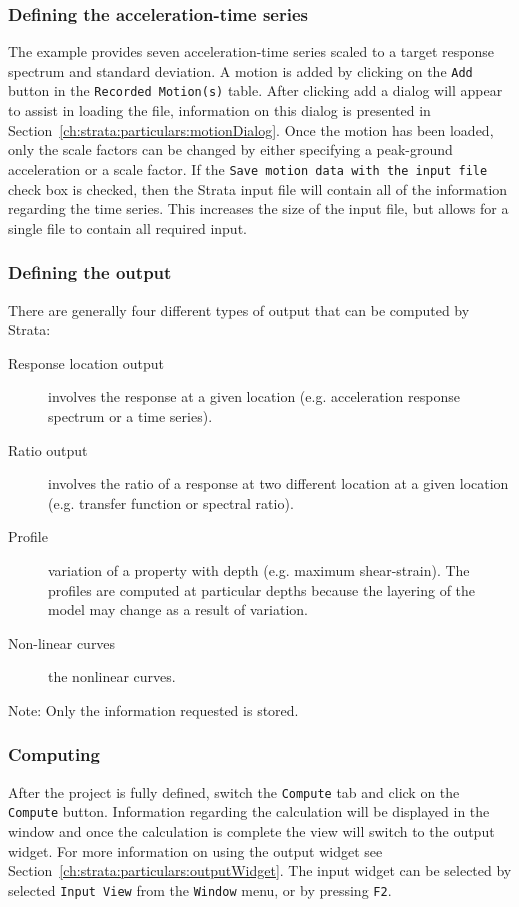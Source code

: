 \documentclass[12pt,oneside]{book}
\begin{document}
\subsubsection{Defining the acceleration-time series}
The example provides seven acceleration-time series scaled to a target response spectrum and
standard deviation.  A motion is added by clicking on the \texttt{Add} button in the
\texttt{Recorded Motion(s)} table.  After clicking add a dialog will appear to assist in loading the
file, information on this dialog is presented in Section~\ref{ch:strata:particulars:motionDialog}.
Once the motion has been loaded, only the scale factors can be changed by either specifying a
peak-ground acceleration or a scale factor.  If the \texttt{Save motion data with the input file}
check box is checked, then the Strata input file will contain all of the information regarding the
time series.  This increases the size of the input file, but allows for a single file to contain all
required input.

\subsubsection{Defining the output}
There are generally four different types of output that can be computed by Strata:
\begin{description}
    \item[Response location output] involves the response at a given location (e.g. acceleration
        response spectrum or a time series).
    \item[Ratio output] involves the ratio of a response at two different location at a given location
        (e.g. transfer function or spectral ratio).
    \item[Profile] variation of a property with depth (e.g. maximum shear-strain).  The profiles are
        computed at particular depths because the layering of the model may change as a result of variation.
    \item[Non-linear curves] the nonlinear curves.
\end{description}

Note: Only the information requested is stored.

\subsubsection{Computing}
After the project is fully defined, switch the \texttt{Compute} tab and click on the
\texttt{Compute} button.  Information regarding the calculation will be displayed in the window and
once the calculation is complete the view will switch to the output widget.  For more information
on using the output widget see Section~\ref{ch:strata:particulars:outputWidget}.  The input widget
can be selected by selected \texttt{Input View} from the \texttt{Window} menu, or by pressing
\texttt{F2}.
\end{document}

